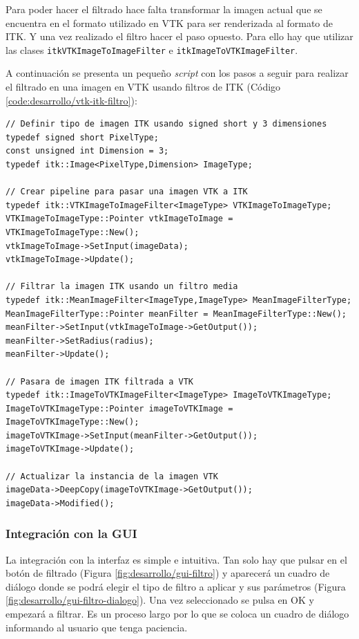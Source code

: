 Para poder hacer el filtrado hace falta transformar la imagen actual que se encuentra en el formato utilizado en VTK para ser renderizada al formato de ITK. Y una vez realizado el filtro hacer el paso opuesto. Para ello hay que utilizar las clases \texttt{itkVTKImageToImageFilter} e \texttt{itkImageToVTKImageFilter}.

A continuación se presenta un pequeño \textit{script} con los pasos a seguir para realizar el filtrado en una imagen en VTK usando filtros de ITK (Código \ref{code:desarrollo/vtk-itk-filtro}):

\begin{lstlisting}[style=C, label=code:desarrollo/vtk-itk-filtro, caption={\textit{script} para usar el filtro media de ITK en una imagen en VTK}]
// Definir tipo de imagen ITK usando signed short y 3 dimensiones
typedef signed short PixelType;
const unsigned int Dimension = 3;
typedef itk::Image<PixelType,Dimension> ImageType;

// Crear pipeline para pasar una imagen VTK a ITK
typedef itk::VTKImageToImageFilter<ImageType> VTKImageToImageType;
VTKImageToImageType::Pointer vtkImageToImage = VTKImageToImageType::New();
vtkImageToImage->SetInput(imageData);
vtkImageToImage->Update();

// Filtrar la imagen ITK usando un filtro media
typedef itk::MeanImageFilter<ImageType,ImageType> MeanImageFilterType;
MeanImageFilterType::Pointer meanFilter = MeanImageFilterType::New();
meanFilter->SetInput(vtkImageToImage->GetOutput());
meanFilter->SetRadius(radius);
meanFilter->Update();

// Pasara de imagen ITK filtrada a VTK
typedef itk::ImageToVTKImageFilter<ImageType> ImageToVTKImageType;
ImageToVTKImageType::Pointer imageToVTKImage = ImageToVTKImageType::New();
imageToVTKImage->SetInput(meanFilter->GetOutput());
imageToVTKImage->Update();

// Actualizar la instancia de la imagen VTK
imageData->DeepCopy(imageToVTKImage->GetOutput());
imageData->Modified();
\end{lstlisting}

\subsubsection{Integración con la GUI}

La integración con la interfaz es simple e intuitiva. Tan solo hay que pulsar en el botón de filtrado (Figura \ref{fig:desarrollo/gui-filtro}) y aparecerá un cuadro de diálogo donde se podrá elegir el tipo de filtro a aplicar y sus parámetros (Figura \ref{fig:desarrollo/gui-filtro-dialogo}). Una vez seleccionado se pulsa en OK y empezará a filtrar. Es un proceso largo por lo que se coloca un cuadro de diálogo informando al usuario que tenga paciencia.

